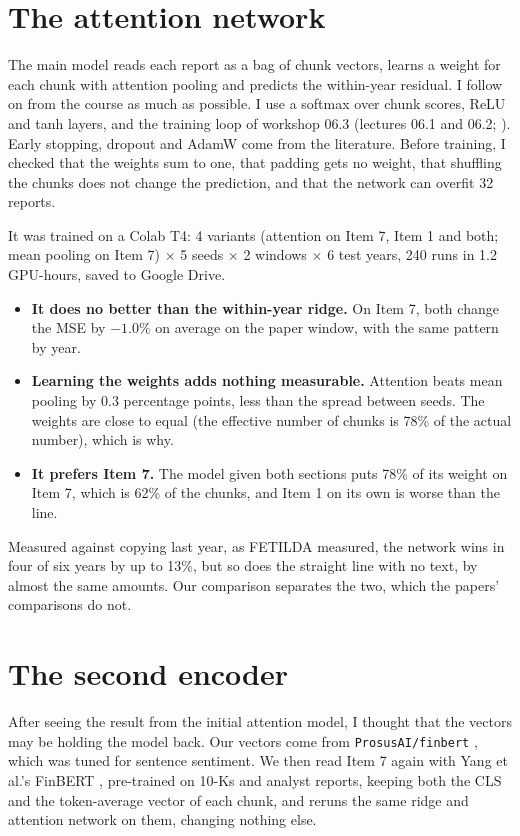 \documentclass[11pt,a4paper]{article}
\begin{document}
\section{The attention network}

The main model reads each report as a bag of chunk vectors, learns a weight for each chunk with attention pooling
\citep{ilse2018} and predicts the within-year residual. I follow on from the course as much as possible. I use a
softmax over chunk scores, ReLU and tanh layers, and the training loop of workshop 06.3 \citep{dst063} (lectures 06.1
and 06.2; \citealp{dst061, dst062}). Early stopping, dropout and AdamW come from the literature. Before training, I
checked that the weights sum to one, that padding gets no weight, that shuffling the chunks does not change the
prediction, and that the network can overfit 32 reports.

It was trained on a Colab T4: 4 variants (attention on Item 7, Item 1 and both; mean pooling on Item 7) $\times$ 5
seeds $\times$ 2 windows $\times$ 6 test years, 240 runs in 1.2 GPU-hours, saved to Google Drive.

\begin{itemize}
  \item \textbf{It does no better than the within-year ridge.} On Item 7, both change the MSE by $-1.0\%$ on average
    on the paper window, with the same pattern by year.
  \item \textbf{Learning the weights adds nothing measurable.} Attention beats mean pooling by 0.3 percentage points,
    less than the spread between seeds. The weights are close to equal (the effective number of chunks is 78\% of the
    actual number), which is why.
  \item \textbf{It prefers Item 7.} The model given both sections puts 78\% of its weight on Item 7, which is 62\% of
    the chunks, and Item 1 on its own is worse than the line.
\end{itemize}

Measured against copying last year, as FETILDA measured, the network wins in four of six years by up to 13\%, but so
does the straight line with no text, by almost the same amounts. Our comparison separates the two, which the papers'
comparisons do not.

\section{The second encoder}

After seeing the result from the initial attention model, I thought that the vectors may be holding the model back.
Our vectors come from \texttt{ProsusAI/finbert} \citep{araci2019}, which was tuned for sentence sentiment. We then read
Item 7 again with Yang et al.'s FinBERT \citep{yang2020}, pre-trained on 10-Ks and analyst reports, keeping
both the CLS and the token-average vector of each chunk, and reruns the same ridge and attention network on them,
changing nothing else.
\end{document}
